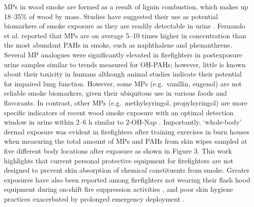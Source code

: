 \documentclass[preprint, 3p,
authoryear]{elsarticle} %
\begin{document}
MPs in wood smoke are formed as a result of lignin combustion, which
makes up 18--35\% of wood by mass. Studies have suggested their use as
potential biomarkers of smoke exposure as they are readily detectable in
urine \citep{19}. Fernando et al. \citep{3} reported that MPs are on
average 5--10 times higher in concentration than the most abundant PAHs
in smoke, such as naphthalene and phenanthrene. Several MP analogues
were significantly elevated in firefighters in postexposure urine
samples similar to trends measured for OH-PAHs; however, little is known
about their toxicity in humans although animal studies indicate their
potential for impaired lung function. However, some MPs (e.g.~vanillin,
eugenol) are not reliable smoke biomarkers, given their ubiquitous use
in various foods and flavorants. In contrast, other MPs
(e.g.~methylsyringol, propylsyringol) are more specific indicators of
recent wood smoke exposure with an optimal detection window in urine
within 2--6 h \citep{19} similar to 2-OH-Nap \citep{39}. Importantly,
`whole-body' dermal exposure was evident in firefighters after training
exercises in burn houses when measuring the total amount of MPs and PAHs
from skin wipes sampled at five different body locations after exposure
as shown in Figure 3. This work highlights that current personal
protective equipment for firefighters are not designed to prevent skin
absorption of chemical constituents from smoke. Greater exposures have
also been reported among firefighters not wearing their flash hood
equipment during on-shift fire suppression activities \citep{29}, and
poor skin hygiene practices exacerbated by prolonged emergency
deployment \citep{32}.
\end{document}
